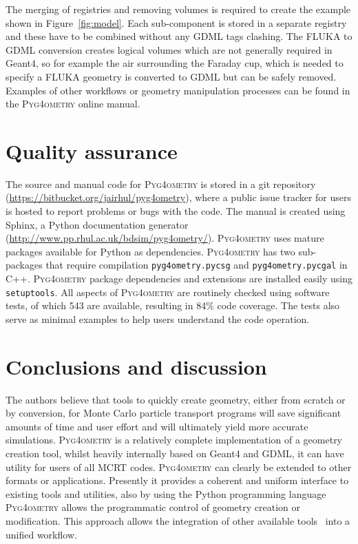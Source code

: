 \documentclass[final,5p,times,twocolumn]{elsarticle}
\newcommand{\pyinline}[1]{\lstinline[postbreak={}]{#1}}
\newcommand{\PYGEOMETRY}{\textsc{Pyg4ometry}}
\begin{document}
The merging of registries and removing volumes is required to create the example shown in Figure~\ref{fig:model}. 
Each sub-component is stored in a separate registry and these have to be combined without any GDML tags clashing. 
The FLUKA to GDML conversion creates logical volumes which are not generally required in Geant4, so for example
the air surrounding the Faraday cup, which is needed to specify a FLUKA geometry is converted to GDML but can be 
safely removed. Examples of other workflows or geometry manipulation processes can be found in 
the \PYGEOMETRY{} online manual.

\section{Quality assurance}
The source and manual code for \PYGEOMETRY{} is stored in a git repository (\url{https://bitbucket.org/jairhul/pyg4ometry}), 
where a public issue tracker for users is hosted to report problems or bugs with the code. The manual is created using Sphinx, a 
Python documentation generator (\url{http://www.pp.rhul.ac.uk/bdsim/pyg4ometry/}). \PYGEOMETRY{} uses mature packages 
available for Python as dependencies. \PYGEOMETRY{} has  two sub-packages that require compilation \pyinline{pyg4ometry.pycsg} 
and \pyinline{pyg4ometry.pycgal} in C++. \PYGEOMETRY{} package dependencies and extensions are installed easily using 
\pyinline{setuptools}. All aspects of \PYGEOMETRY{} are routinely checked using software tests, of which 543 are available,  
resulting in 84\% code coverage. The tests also serve as minimal examples to help users understand the code operation.

\section{Conclusions and discussion}
The authors believe that tools to quickly create geometry, either from scratch or by conversion,
for Monte Carlo particle transport programs
will save significant amounts of time and user effort and will ultimately 
yield more accurate simulations. \PYGEOMETRY{} is a relatively complete implementation of a geometry 
creation tool, whilst heavily internally based on Geant4 and GDML, it can have utility for users of all MCRT 
codes. \PYGEOMETRY{} can clearly be extended to other formats or applications. Presently it provides a coherent and 
uniform interface to existing tools and utilities, also by using the Python programming language \PYGEOMETRY{} 
allows the programmatic control of geometry creation or modification. This approach allows the integration of 
other available tools~\cite{DavisNIMA915-65} into a unified workflow.
\end{document}
